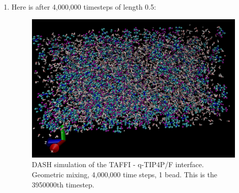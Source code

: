 \documentclass[12pt,reqno]{amsart}
\numberwithin{equation}{section}
\begin{document}
\begin{enumerate}
\item Here is after 4,000,000 timesteps of length 0.5:

\begin{figure}[H]
\centering
\includegraphics[scale=0.7]{dash_taffi-tip4pF_geometric_1bead_3950000}
\caption{DASH simulation of the TAFFI - q-TIP4P/F interface.  Geometric mixing, 4,000,000 time steps, 1 bead.  This is the 3950000th timestep.}
\end{figure}
  
\end{enumerate}
\end{document}
